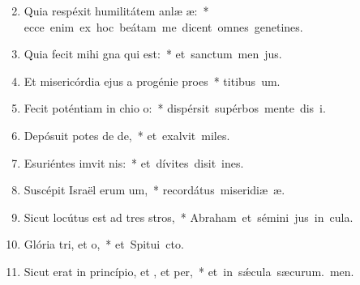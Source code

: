 \begin{flushleft}
\begin{enumerate}[leftmargin=*]
\setcounter{enumi}{1}

\item Quia respéxit humilitátem anlæ æ:~* \mbox{ecce enim ex hoc beátam me dicent omnes genetines.}

\item Quia fecit mihi gna qui  est:~* \mbox{et sanctum men jus.}

\item Et misericórdia ejus a progénie  proes~* \mbox{titibus um.}

\item Fecit poténtiam in chio o:~* \mbox{dispérsit supérbos mente dis i.}

\item Depósuit potes de de,~* \mbox{et exalvit miles.}

\item Esuriéntes imvit nis:~* \mbox{et dívites disit ines.}

\item Suscépit Israël erum um,~* \mbox{recordátus miseridiæ æ.}

\item Sicut locútus est ad tres stros,~* \mbox{Abraham et sémini jus in cula.}

\item Glória tri, et o,~* \mbox{et Spitui cto.}

\item Sicut erat in princípio, et , et per,~* \mbox{et in s\'{\ae}cula sæcurum. men.}


\end{enumerate}
\end{flushleft}

